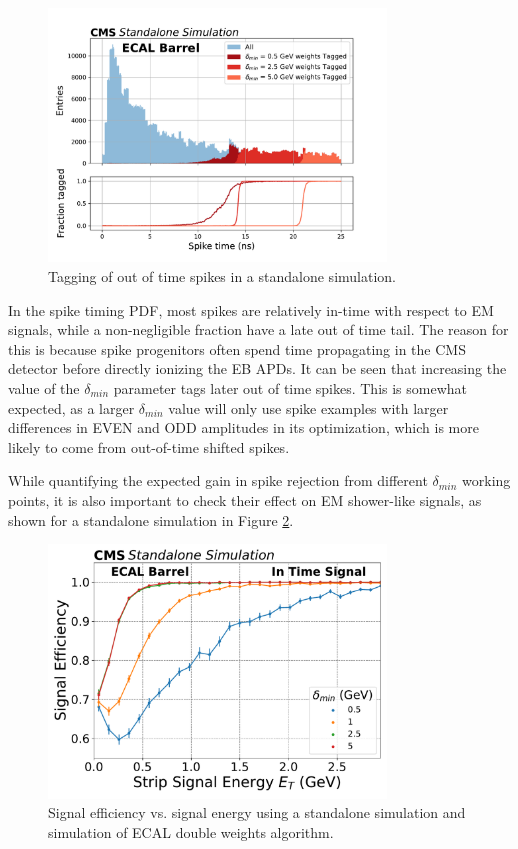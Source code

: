 \begin{figure}[H]
    \centering
    \includegraphics[width=0.8\textwidth]{Images/ECAL/DW/Double_Amplitude_Weights_SpikeTaggingwithOOTWeights_allDeltaMins.pdf}
    \caption{Tagging of out of time spikes in a standalone simulation.}
    \label{fig:DW_StandaloneSimulation_SpikeTimingPDFTagging} 
\end{figure}

In the spike timing PDF, most spikes are relatively in-time with respect to EM signals, while a non-negligible fraction have a late out of time tail. The reason for this is because spike progenitors often spend time propagating in the CMS detector before directly ionizing the EB APDs. It can be seen that increasing the value of the $\delta_{min}$ parameter tags later out of time spikes. This is somewhat expected, as a larger $\delta_{min}$ value will only use spike examples with larger differences in EVEN and ODD amplitudes in its optimization, which is more likely to come from out-of-time shifted spikes. 

While quantifying the expected gain in spike rejection from different $\delta_{min}$ working points, it is also important to check their effect on EM shower-like signals, as shown for a standalone simulation in Figure \ref{fig:SimSignaltaggedvsE}. 

\begin{figure}[H]
    \centering
    \includegraphics[width=0.8\textwidth]{Images/ECAL/DW/SigEff_vs_SigET.pdf}
    \caption{Signal efficiency vs. signal energy using a standalone simulation and simulation of ECAL double weights algorithm.}
    \label{fig:SimSignaltaggedvsE}
\end{figure}

